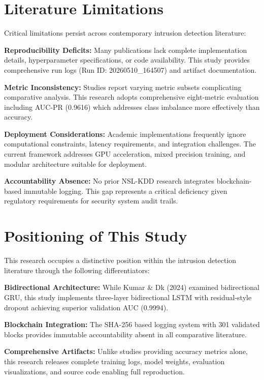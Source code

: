 \documentclass[12pt,a4paper]{report}
\begin{document}
\section{Literature Limitations}

Critical limitations persist across contemporary intrusion detection literature:

\textbf{Reproducibility Deficits:} Many publications lack complete implementation details, hyperparameter specifications, or code availability. This study provides comprehensive run logs (Run ID: 20260510\_164507) and artifact documentation.

\textbf{Metric Inconsistency:} Studies report varying metric subsets complicating comparative analysis. This research adopts comprehensive eight-metric evaluation including AUC-PR (0.9616) which addresses class imbalance more effectively than accuracy.

\textbf{Deployment Considerations:} Academic implementations frequently ignore computational constraints, latency requirements, and integration challenges. The current framework addresses GPU acceleration, mixed precision training, and modular architecture suitable for deployment.

\textbf{Accountability Absence:} No prior NSL-KDD research integrates blockchain-based immutable logging. This gap represents a critical deficiency given regulatory requirements for security system audit trails.

\section{Positioning of This Study}

This research occupies a distinctive position within the intrusion detection literature through the following differentiators:

\textbf{Bidirectional Architecture:} While Kumar \& Dk (2024) examined bidirectional GRU, this study implements three-layer bidirectional LSTM with residual-style dropout achieving superior validation AUC (0.9994).

\textbf{Blockchain Integration:} The SHA-256 based logging system with 301 validated blocks provides immutable accountability absent in all comparative literature.

\textbf{Comprehensive Artifacts:} Unlike studies providing accuracy metrics alone, this research releases complete training logs, model weights, evaluation visualizations, and source code enabling full reproduction.
\end{document}
